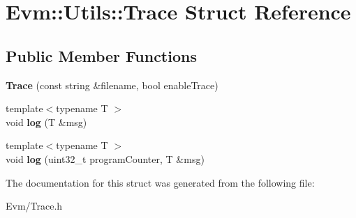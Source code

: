 \hypertarget{struct_evm_1_1_utils_1_1_trace}{}\section{Evm\+:\+:Utils\+:\+:Trace Struct Reference}
\label{struct_evm_1_1_utils_1_1_trace}
\subsection*{Public Member Functions}
\begin{DoxyCompactItemize}
\item 
\mbox{\label{struct_evm_1_1_utils_1_1_trace_a710db8b5fd1414e21558c5f2fc62afbb}} 
{\bfseries Trace} (const string \&filename, bool enable\+Trace)
\item 
\mbox{\label{struct_evm_1_1_utils_1_1_trace_ad86cec2f5fd9ac33e0360748bb0c99b0}} 
{\footnotesize template$<$typename T $>$ }\\void {\bfseries log} (T \&msg)
\item 
\mbox{\label{struct_evm_1_1_utils_1_1_trace_a39338a28b52c985b982d9f26ed8258cb}} 
{\footnotesize template$<$typename T $>$ }\\void {\bfseries log} (uint32\+\_\+t program\+Counter, T \&msg)
\end{DoxyCompactItemize}


The documentation for this struct was generated from the following file\+:\begin{DoxyCompactItemize}
\item 
Evm/Trace.\+h\end{DoxyCompactItemize}

